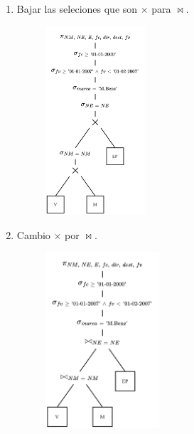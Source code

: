 \documentclass{templateNote}
\begin{document}
\begin{itemize}
\begin{enumerate}
        \item Bajar las seleciones que son $\times$ para $\Join$.
        \begin{figure}[H]
            \centering
            \includegraphics[width=0.35\textwidth]{img/E6-Paso-3.png}
        \end{figure}

        \item Cambio $\times$ por $\Join$.
        \begin{figure}[H]
            \centering
            \includegraphics[width=0.4\textwidth]{img/E6-Paso-4.png}
        \end{figure}


\end{enumerate}
\end{itemize}
\end{document}
